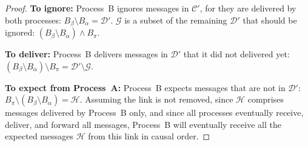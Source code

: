 \begin{proof}
  \noindent\textbf{To ignore:} Process~B ignores messages in $\mathcal{C}'$,
  for they are
  delivered by both processes: $B_\beta \setminus B_\alpha = \mathcal{D}'$.
  $\mathcal{G}$ is a subset of the remaining $\mathcal{D}'$ that should be
  ignored: $(B_\beta \setminus B_\alpha) \wedge B_\pi$.

  \noindent \textbf{To deliver:} Process~B delivers messages in $\mathcal{D}'$
  that it did not delivered yet:
  $(B_\beta\setminus B_\alpha) \setminus B_\pi = \mathcal{D}' \setminus
  \mathcal{G}$.
  
  \noindent \textbf{To expect from Process~A:} Process~B expects messages that
  are not in $\mathcal{D}'$:
  $B_\pi \setminus (B_\beta \setminus B_\alpha) = \mathcal{H}$.  Assuming the
  link is not removed, since $\mathcal{H}$ comprises messages delivered by
  Process~B only, and since all processes eventually receive, deliver, and
  forward all messages, Process~B will eventually receive all the expected
  messages $\mathcal{H}$ from this link in causal order.
\end{proof}


